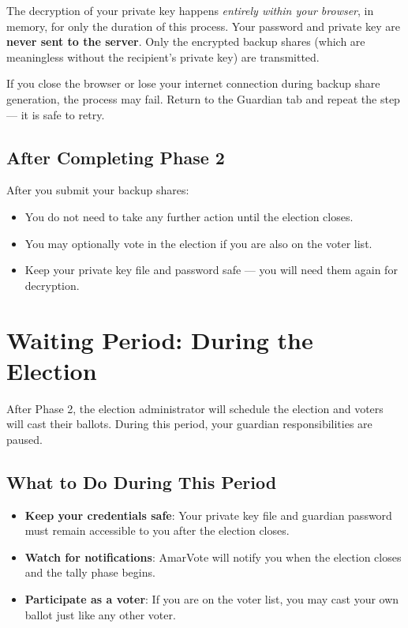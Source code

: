 \documentclass[12pt,a4paper]{book}
\begin{document}
\begin{tcolorbox}[notebox]
The decryption of your private key happens \emph{entirely within your browser}, in memory, for only the duration of this process. Your password and private key are \textbf{never sent to the server}. Only the encrypted backup shares (which are meaningless without the recipient's private key) are transmitted.
\end{tcolorbox}

\begin{tcolorbox}[warnbox]
If you close the browser or lose your internet connection during backup share generation, the process may fail. Return to the Guardian tab and repeat the step --- it is safe to retry.
\end{tcolorbox}

\section{After Completing Phase 2}

After you submit your backup shares:
\begin{itemize}
  \item You do not need to take any further action until the election closes.
  \item You may optionally vote in the election if you are also on the voter list.
  \item Keep your private key file and password safe --- you will need them again for decryption.
\end{itemize}

\chapter{Waiting Period: During the Election}
\label{ch:guard-during}

After Phase 2, the election administrator will schedule the election and voters will cast their ballots. During this period, your guardian responsibilities are paused.

\section{What to Do During This Period}

\begin{itemize}
  \item \textbf{Keep your credentials safe}: Your private key file and guardian password must remain accessible to you after the election closes.
  \item \textbf{Watch for notifications}: AmarVote will notify you when the election closes and the tally phase begins.
  \item \textbf{Participate as a voter}: If you are on the voter list, you may cast your own ballot just like any other voter.
\end{itemize}
\end{document}
